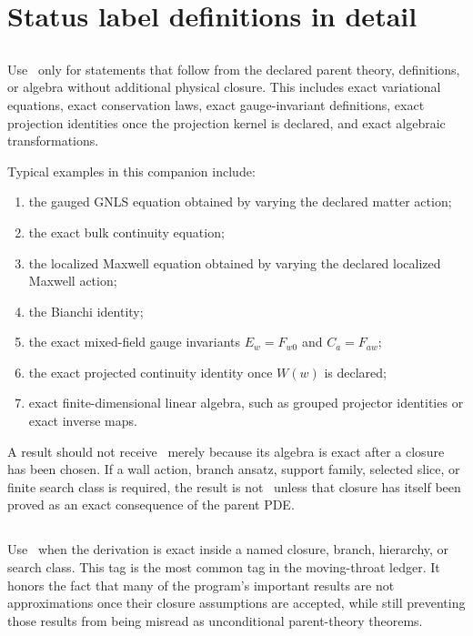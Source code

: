 \section{Status label definitions in detail}
\label{sec:status-labels-detail}

\subsection{\StatusExact}
\label{subsec:status-exact}

Use \StatusExact\ only for statements that follow from the declared parent theory, definitions, or algebra without additional physical closure.  This includes exact variational equations, exact conservation laws, exact gauge-invariant definitions, exact projection identities once the projection kernel is declared, and exact algebraic transformations.

Typical examples in this companion include:
\begin{enumerate}[leftmargin=2.2em]
  \item the gauged GNLS equation obtained by varying the declared matter action;
  \item the exact bulk continuity equation;
  \item the localized Maxwell equation obtained by varying the declared localized Maxwell action;
  \item the Bianchi identity;
  \item the exact mixed-field gauge invariants \(E_w=F_{w0}\) and \(C_a=F_{aw}\);
  \item the exact projected continuity identity once \(W(w)\) is declared;
  \item exact finite-dimensional linear algebra, such as grouped projector identities or exact inverse maps.
\end{enumerate}

A result should not receive \StatusExact\ merely because its algebra is exact after a closure has been chosen.  If a wall action, branch ansatz, support family, selected slice, or finite search class is required, the result is not \StatusExact\ unless that closure has itself been proved as an exact consequence of the parent PDE.

\subsection{\StatusExactClosure}
\label{subsec:status-exact-closure}

Use \StatusExactClosure\ when the derivation is exact inside a named closure, branch, hierarchy, or search class.  This tag is the most common tag in the moving-throat ledger.  It honors the fact that many of the program's important results are not approximations once their closure assumptions are accepted, while still preventing those results from being misread as unconditional parent-theory theorems.

